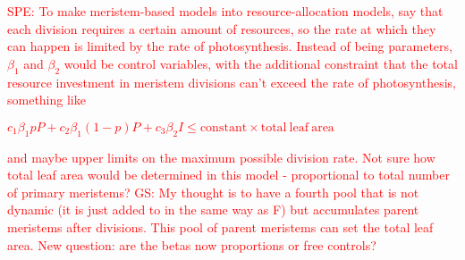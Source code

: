 \documentclass[12pt, oneside]{article}   	%
\begin{document}
\textcolor{red}{SPE: To make meristem-based models into resource-allocation models, say that each division requires a certain amount of resources, so the rate at which they can happen is limited by the rate of photosynthesis. Instead of being parameters, $\beta_1$ and $\beta_2$ would be control variables, with the additional constraint that the total resource investment in meristem divisions can't exceed the rate of photosynthesis, something like}

\textcolor{red}{$c_1 \beta_1 p P + c_2 \beta_1 (1-p) P + c_3 \beta_2 I  \le \mathrm{constant}\times \mathrm{total\ leaf\ area} $}

\textcolor{red}{and maybe upper limits on the maximum possible division rate. Not sure how total leaf area would be determined in this model - proportional to total number of primary meristems? GS: My thought is to have a fourth pool that is not dynamic (it is just added to in the same way as F) but accumulates parent meristems after divisions. This pool of parent meristems can set the total leaf area. New question: are the betas now proportions or free controls?}


\clearpage
 

\end{document}
